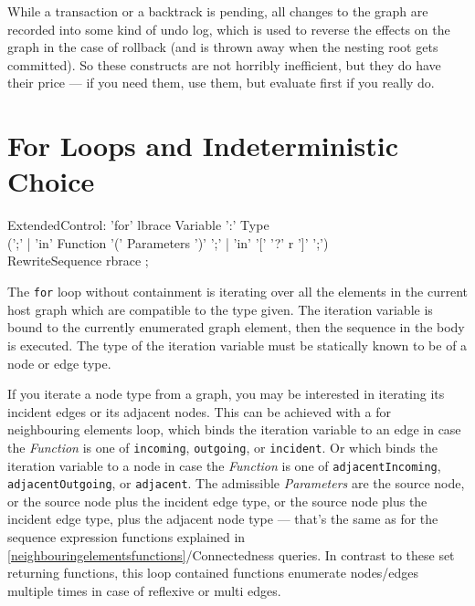 \begin{note}
While a transaction or a backtrack is pending, all changes to the graph are recorded into some kind of undo log, which is used to reverse the effects on the graph in the case of rollback (and is thrown away when the nesting root gets committed).
So these constructs are not horribly inefficient, but they do have their price --- if you need them, use them, but evaluate first if you really do.
\end{note}


\section{For Loops and Indeterministic Choice}

\begin{rail}
  ExtendedControl:
    'for' lbrace Variable ':' Type\\
    (';' |
    'in' Function '(' Parameters ')' ';' |
    'in' '[' '?' r ']' ';')\\
    RewriteSequence rbrace
    ;
\end{rail}\label{forgraphelem}\label{forincidentadjacent}\label{formatch}

The \texttt{for} loop without containment is iterating over all the elements in the current host graph which are compatible to the type given.
The iteration variable is bound to the currently enumerated graph element, then the sequence in the body is executed.
The type of the iteration variable must be statically known to be of a node or edge type.

If you iterate a node type from a graph, you may be interested in iterating its incident edges or its adjacent nodes.
This can be achieved with a for neighbouring elements loop, which binds the iteration variable to an edge in case the \emph{Function} is one of \texttt{incoming}, \texttt{outgoing}, or \texttt{incident}. 
Or which binds the iteration variable to a node in case the \emph{Function} is one of \texttt{adjacentIncoming}, \texttt{adjacentOutgoing}, or \texttt{adjacent}.
The admissible \emph{Parameters} are the source node, or the source node plus the incident edge type, or the source node plus the incident edge type, plus the adjacent node type ---
that's the same as for the sequence expression functions explained in \ref{neighbouringelementsfunctions}/Connectedness queries.
In contrast to these set returning functions, this loop contained functions enumerate nodes/edges multiple times in case of reflexive or multi edges.

